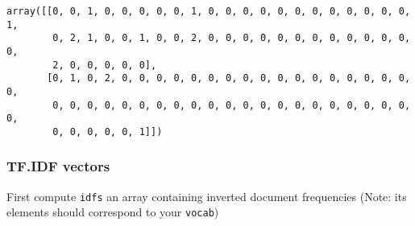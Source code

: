 \documentclass[11pt]{article}
\makeatletter
\newcommand{\boxspacing}{\kern\kvtcb@left@rule\kern\kvtcb@boxsep}
\newcommand{\prompt}[4]{
        \ttfamily\llap{{\color{#2}[#3]:\hspace{3pt}#4}}\vspace{-\baselineskip}
    }
\makeatother
\begin{document}
            \begin{tcolorbox}[breakable, size=fbox, boxrule=.5pt, pad at break*=1mm, opacityfill=0]
\prompt{Out}{outcolor}{16}{\boxspacing}
\begin{Verbatim}[commandchars=\\\{\}]
array([[0, 0, 1, 0, 0, 0, 0, 0, 1, 0, 0, 0, 0, 0, 0, 0, 0, 0, 0, 0, 0, 1,
        0, 2, 1, 0, 0, 1, 0, 0, 2, 0, 0, 0, 0, 0, 0, 0, 0, 0, 0, 0, 0, 0,
        2, 0, 0, 0, 0, 0],
       [0, 1, 0, 2, 0, 0, 0, 0, 0, 0, 0, 0, 0, 0, 0, 0, 0, 0, 0, 0, 0, 0,
        0, 0, 0, 0, 0, 0, 0, 0, 0, 0, 0, 0, 0, 0, 0, 0, 0, 0, 0, 0, 0, 0,
        0, 0, 0, 0, 0, 1]])
\end{Verbatim}
\end{tcolorbox}

    \hypertarget{tf.idf-vectors}{%
\subsubsection{TF.IDF vectors}\label{tf.idf-vectors}}

First compute \texttt{idfs} an array containing inverted document
frequencies (Note: its elements should correspond to your
\texttt{vocab})
\end{document}

